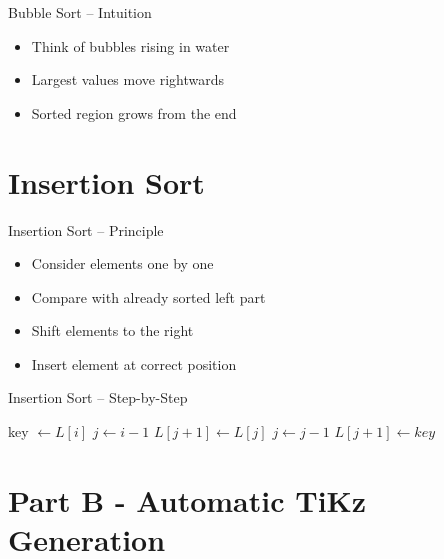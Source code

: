 \documentclass[aspectratio=169]{beamer}
\begin{document}
\begin{frame}{Bubble Sort – Intuition}
\begin{itemize}
    \item<1-> Think of bubbles rising in water
    \item<2-> Largest values move rightwards
    \item<3-> Sorted region grows from the end
\end{itemize}
\end{frame}

\section{Insertion Sort}

\begin{frame}{Insertion Sort – Principle}
\begin{itemize}
    \item<1-> Consider elements one by one
    \item<2-> Compare with already sorted left part
    \item<3-> Shift elements to the right
    \item<4-> Insert element at correct position
\end{itemize}
\end{frame}


\begin{frame}{Insertion Sort – Step-by-Step}
\setcounter{algorithm}{1}
\begin{algorithm}[H]
\caption{Insertion Sort}
\begin{algorithmic}[1]
 \pause
    \State key $\gets L[i]$ \pause
    \State $j \gets i-1$ \pause
     \pause
        \State $L[j+1] \gets L[j]$ \pause
        \State $j \gets j-1$ \pause
    \EndWhile
    \State $L[j+1] \gets key$
\EndFor
\end{algorithmic}
\end{algorithm}
\end{frame}
\section{Part B - Automatic TiKz Generation}
\end{document}
